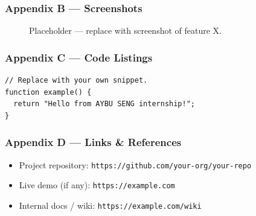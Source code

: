 \documentclass[11pt,a4paper]{article}
\begin{document}
\subsubsection*{Appendix B — Screenshots}
\begin{figure}[H]
  \centering
  \fbox{\rule{0pt}{5cm}\rule{10cm}{0pt}}
  \caption{Placeholder — replace with screenshot of feature X.}
  \label{fig:screenshot-x}
\end{figure}

\subsubsection*{Appendix C — Code Listings}
\begin{verbatim}
// Replace with your own snippet.
function example() {
  return "Hello from AYBU SENG internship!";
}
\end{verbatim}

\subsubsection*{Appendix D — Links \& References}
\begin{itemize}
  \item Project repository: \texttt{https://github.com/your-org/your-repo}
  \item Live demo (if any): \texttt{https://example.com}
  \item Internal docs / wiki: \texttt{https://example.com/wiki}
\end{itemize}
\end{document}
